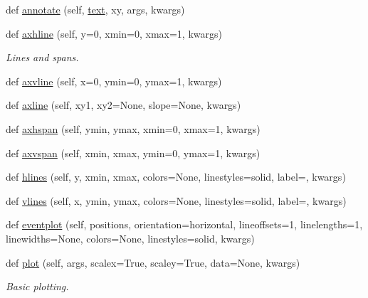 \begin{DoxyCompactItemize}
\item 
def \hyperlink{classmatplotlib_1_1axes_1_1__axes_1_1Axes_a8bfc86e6ac0c229240ff8d40416c5b4b}{annotate} (self, \hyperlink{classmatplotlib_1_1axes_1_1__axes_1_1Axes_a73ed6fed1fd809148b1fb6936b993dbe}{text}, xy, args, kwargs)
\item 
def \hyperlink{classmatplotlib_1_1axes_1_1__axes_1_1Axes_a39d5389c184d082a7b9819f23159235a}{axhline} (self, y=0, xmin=0, xmax=1, kwargs)
\begin{DoxyCompactList}\small\item\em Lines and spans. \end{DoxyCompactList}\item 
def \hyperlink{classmatplotlib_1_1axes_1_1__axes_1_1Axes_a1d82d7a20cc9e11ef558b1fd852f901f}{axvline} (self, x=0, ymin=0, ymax=1, kwargs)
\item 
def \hyperlink{classmatplotlib_1_1axes_1_1__axes_1_1Axes_ae0a16b77e61db36638b6bd09dfdecd9f}{axline} (self, xy1, xy2=None, slope=None, kwargs)
\item 
def \hyperlink{classmatplotlib_1_1axes_1_1__axes_1_1Axes_a16015052a14c403c1a060e89fb36a62d}{axhspan} (self, ymin, ymax, xmin=0, xmax=1, kwargs)
\item 
def \hyperlink{classmatplotlib_1_1axes_1_1__axes_1_1Axes_a409bdfce4dd1a3c579f01263ec4c2d97}{axvspan} (self, xmin, xmax, ymin=0, ymax=1, kwargs)
\item 
def \hyperlink{classmatplotlib_1_1axes_1_1__axes_1_1Axes_a83ef8ccb9ff037850f26c0df4b5e1835}{hlines} (self, y, xmin, xmax, colors=None, linestyles=\textquotesingle{}solid\textquotesingle{}, label=\textquotesingle{}\textquotesingle{}, kwargs)
\item 
def \hyperlink{classmatplotlib_1_1axes_1_1__axes_1_1Axes_abcd79168e1e7e38f18c4d4b276dcd441}{vlines} (self, x, ymin, ymax, colors=None, linestyles=\textquotesingle{}solid\textquotesingle{}, label=\textquotesingle{}\textquotesingle{}, kwargs)
\item 
def \hyperlink{classmatplotlib_1_1axes_1_1__axes_1_1Axes_ad1e970c22ddd9f0fe2e2a4803274397d}{eventplot} (self, positions, orientation=\textquotesingle{}horizontal\textquotesingle{}, lineoffsets=1, linelengths=1, linewidths=None, colors=None, linestyles=\textquotesingle{}solid\textquotesingle{}, kwargs)
\item 
def \hyperlink{classmatplotlib_1_1axes_1_1__axes_1_1Axes_ad11333c8460b3a25caa912de1f7e7968}{plot} (self, args, scalex=True, scaley=True, data=None, kwargs)
\begin{DoxyCompactList}\small\item\em Basic plotting. \end{DoxyCompactList}\item 

\end{DoxyCompactItemize}
